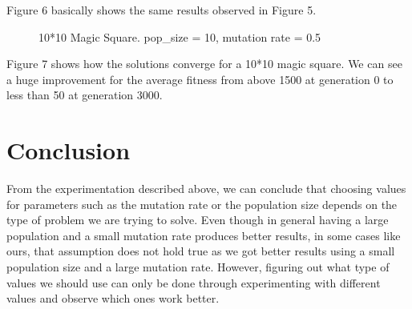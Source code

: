 \documentclass[12pt]{article}
\begin{document}
			Figure 6 basically shows the same results observed in Figure 5.
			\begin{figure}[H]
				\hfill
				\hfill
				\hfill
				\caption{10*10 Magic Square. pop\_size = 10, mutation rate = 0.5}
			\end{figure}
		
			Figure 7 shows how the solutions converge for a 10*10 magic square. We can see a huge improvement for the average fitness from above 1500 at generation 0 to less than 50 at generation 3000.
	\section{Conclusion}
		From the experimentation described above, we can conclude that choosing values for parameters such as the mutation rate or the population size depends on the type of problem  we are trying to solve. Even though in general having a large population and a small mutation rate produces better results, in some cases like ours, that assumption does not hold true as we got better results using a small population size and a large mutation rate. However, figuring out what type of values we should use can only be done through experimenting with different values and observe which ones work better.  
	
	
\end{document}
